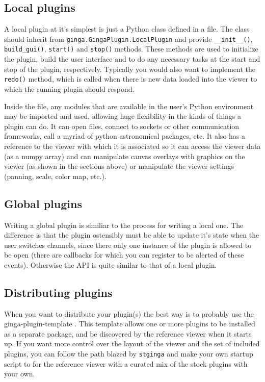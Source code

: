 \documentclass[]{article}
\begin{document}
\begin{multicols}{3}
\subsection*{Local plugins}
A local plugin at it's simplest is just a Python class defined in a file.  
The class should inherit from {\tt ginga.GingaPlugin.LocalPlugin}
and provide {\tt \_\_init\_\_()}, {\tt build\_gui()}, {\tt start()}
and {\tt stop()} methods.  These methods are used to initialize the
plugin, build the user interface and to do any necessary tasks at the
start and stop of the plugin, respectively. Typically you would also
want to implement the {\tt redo()} method, which is called when there is
new data loaded into the viewer to which the running plugin should respond.

Inside the file, any modules that are available in the user's Python
environment may be imported and used, allowing huge flexibility in
the kinds of things a plugin can do.  It can open files, connect to
sockets or other communication frameworks, call a myriad of python
astronomical packages, etc.  It also has a reference to the viewer with
which it is associated so it can access the viewer data (as a numpy array)
and can manipulate canvas overlays with graphics on the viewer (as shown
in the sections above) or manipulate the viewer settings (panning,
scale, color map, etc.).

\subsection*{Global plugins}
Writing a global plugin is similiar to the process for writing a local
one.  The difference is that the plugin ostensibly must be able to
update it's state when the user switches channels, since there only
one instance of the plugin is allowed to be open (there are callbacks
for which you can register to be alerted of these events).  Otherwise
the API is quite similar to that of a local plugin.

\subsection*{Distributing plugins}
When you want to distribute your plugin(s) the best way is to probably use
the ginga-plugin-template \cite{plugin-template}.  This template allows one
or more plugins to be installed as a separate package, and be
discovered by the reference viewer when it starts up.  If you want
more control over the layout of the viewer and the set of included
plugins, you can follow the path blazed by {\tt stginga} and make your own
startup script to for the reference viewer with a curated mix of the
stock plugins with your own. 


\end{multicols}
\end{document}
